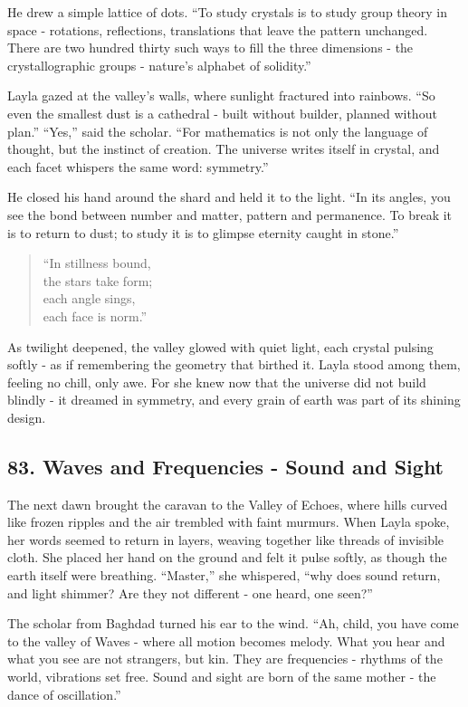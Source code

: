\documentclass[
  letterpaper,
  DIV=11,
  numbers=noendperiod]{scrreprt}
\begin{document}
He drew a simple lattice of dots. ``To study crystals is to study group
theory in space - rotations, reflections, translations that leave the
pattern unchanged. There are two hundred thirty such ways to fill the
three dimensions - the crystallographic groups - nature's alphabet of
solidity.''

Layla gazed at the valley's walls, where sunlight fractured into
rainbows. ``So even the smallest dust is a cathedral - built without
builder, planned without plan.'' ``Yes,'' said the scholar. ``For
mathematics is not only the language of thought, but the instinct of
creation. The universe writes itself in crystal, and each facet whispers
the same word: symmetry.''

He closed his hand around the shard and held it to the light. ``In its
angles, you see the bond between number and matter, pattern and
permanence. To break it is to return to dust; to study it is to glimpse
eternity caught in stone.''

\begin{quote}
``In stillness bound,\\
the stars take form;\\
each angle sings,\\
each face is norm.''
\end{quote}

As twilight deepened, the valley glowed with quiet light, each crystal
pulsing softly - as if remembering the geometry that birthed it. Layla
stood among them, feeling no chill, only awe. For she knew now that the
universe did not build blindly - it dreamed in symmetry, and every grain
of earth was part of its shining design.

\subsection{83. Waves and Frequencies - Sound and
Sight}\label{waves-and-frequencies---sound-and-sight}

The next dawn brought the caravan to the Valley of Echoes, where hills
curved like frozen ripples and the air trembled with faint murmurs. When
Layla spoke, her words seemed to return in layers, weaving together like
threads of invisible cloth. She placed her hand on the ground and felt
it pulse softly, as though the earth itself were breathing. ``Master,''
she whispered, ``why does sound return, and light shimmer? Are they not
different - one heard, one seen?''

The scholar from Baghdad turned his ear to the wind. ``Ah, child, you
have come to the valley of Waves - where all motion becomes melody. What
you hear and what you see are not strangers, but kin. They are
frequencies - rhythms of the world, vibrations set free. Sound and sight
are born of the same mother - the dance of oscillation.''
\end{document}
